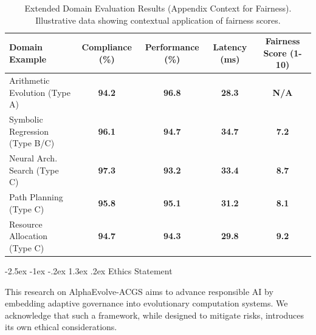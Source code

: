\documentclass[manuscript,screen,9pt]{acmart}
\makeatletter
\renewcommand\section{\@startsection{section}{1}{\z@}%
  {-2.5ex \@plus -1ex \@minus -.2ex}%
  {1.3ex \@plus.2ex}%
  {\normalfont\Large\bfseries}}
\newcommand{\tablesize}{\footnotesize}
\newcommand{\tablenumfmt}[1]{\textbf{#1}}
\newcommand{\tableheader}[1]{\textbf{#1}}
\makeatother
\begin{document}
\begin{table}[htbp]
\centering
\caption{Extended Domain Evaluation Results (Appendix Context for Fairness). Illustrative data showing contextual application of fairness scores.}
\label{tab:appendix_extended_domain_results_fairness}
\tablesize
\begin{tabular}{@{}lcccc@{}}
\toprule
\tableheader{Domain Example} & \tableheader{Compliance (\%)} & \tableheader{Performance (\%)} & \tableheader{Latency (ms)} & \tableheader{Fairness Score (1-10)} \\
\midrule
Arithmetic Evolution (Type A) & \tablenumfmt{94.2} & \tablenumfmt{96.8} & \tablenumfmt{28.3} & \tablenumfmt{N/A} \\
Symbolic Regression (Type B/C) & \tablenumfmt{96.1} & \tablenumfmt{94.7} & \tablenumfmt{34.7} & \tablenumfmt{7.2} \\
Neural Arch. Search (Type C) & \tablenumfmt{97.3} & \tablenumfmt{93.2} & \tablenumfmt{33.4} & \tablenumfmt{8.7} \\
Path Planning (Type C) & \tablenumfmt{95.8} & \tablenumfmt{95.1} & \tablenumfmt{31.2} & \tablenumfmt{8.1} \\
Resource Allocation (Type C) & \tablenumfmt{94.7} & \tablenumfmt{94.3} & \tablenumfmt{29.8} & \tablenumfmt{9.2} \\
\bottomrule
\end{tabular}
\end{table}

\section{Ethics Statement}
\label{sec:ethics}

This research on AlphaEvolve-ACGS aims to advance responsible AI by embedding adaptive governance into evolutionary computation systems. We acknowledge that such a framework, while designed to mitigate risks, introduces its own ethical considerations.
\end{document}
